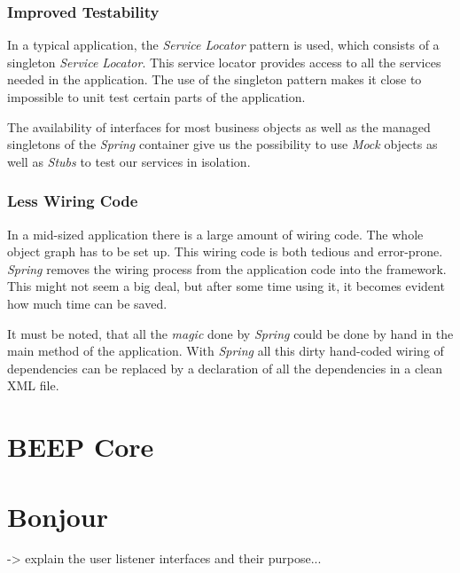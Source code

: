 \subsubsection{Improved Testability}
In a typical application, the \emph{Service Locator} pattern is used, which
consists of a singleton \emph{Service Locator}. This service locator provides
access to all the services needed in the application. The use of the singleton
pattern makes it close to impossible to unit test certain parts of the
application.

The availability of interfaces for most business objects as well as the
managed singletons of the \emph{Spring} container give us the possibility
to use \emph{Mock} objects as well as \emph{Stubs} to test our services
in isolation.

\subsubsection{Less Wiring Code}
In a mid-sized application there is a large amount of wiring code. The whole
object graph has to be set up. This wiring code is both tedious and
error-prone. \emph{Spring} removes the wiring process from the application
code into the framework. This might not seem a big deal, but after some time
using it, it becomes evident how much time can be saved.

It must be noted, that all the \emph{magic} done by \emph{Spring} could be
done by hand in the main method of the application. With \emph{Spring} all
this dirty hand-coded wiring of dependencies can be replaced by a 
declaration of all the dependencies in a clean XML file.


\section{BEEP Core}


\section{Bonjour}
-> explain the user listener interfaces and their purpose...

